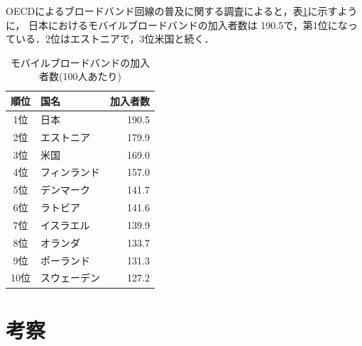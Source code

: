 \documentclass[a4paper,11pt,dvipdfmx]{ujarticle}
\begin{document}
OECDによるブロードバンド回線の普及に関する調査\cite{oecd}によると，表\ref{tbl:bb}に示すように，
日本におけるモバイルブロードバンドの加入者数は 190.5で，第1位になっている．2位はエストニアで，3位米国と続く．

\begin{table}[htbp]
    \centering
    \caption{モバイルブロードバンドの加入者数(100人あたり)}
    \label{tbl:bb}
    \begin{tabular}{|c|l|r|}
        \hline
        順位 & 国名 & 加入者数 \\\hline
        1位 & 日本 & 190.5 \\\hline
        2位 & エストニア & 179.9 \\\hline
        3位 & 米国 & 169.0 \\\hline
        4位 & フィンランド & 157.0 \\\hline
        5位 & デンマーク & 141.7 \\\hline
        6位 & ラトビア & 141.6 \\\hline
        7位 & イスラエル & 139.9 \\\hline
        8位 & オランダ & 133.7\\\hline
        9位 & ポーランド & 131.3\\\hline
        10位 & スウェーデン & 127.2\\\hline
    \end{tabular}
\end{table}

\section{考察}


%

%


\end{document}
